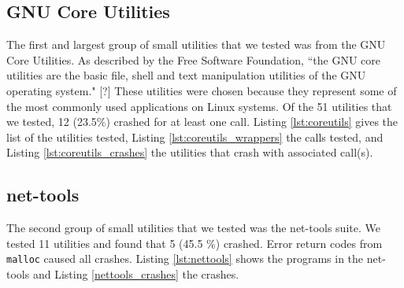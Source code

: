 \subsection{GNU Core Utilities}
The first and largest group of small utilities that we tested was from the GNU Core Utilities. As described by the Free Software Foundation, ``the GNU core utilities are the basic file, shell and text manipulation utilities of the GNU operating system." [?] These utilities were chosen because they represent some of the most commonly used applications on Linux systems. Of the 51 utilities that we tested, 12 (23.5\%) crashed for at least one call. Listing \ref{lst:coreutils} gives the list of the utilities tested, Listing \ref{lst:coreutils_wrappers} the calls tested, and Listing \ref{lst:coreutils_crashes} the utilities that crash with associated call(s).



\subsection{net-tools}
The second group of small utilities that we tested was the net-tools suite. We tested 11 utilities and found that 5 (45.5 \%) crashed. Error return codes from \texttt{malloc} caused all crashes. Listing \ref{lst:nettools} shows the programs in the net-tools and Listing \ref{nettools_crashes} the crashes.

